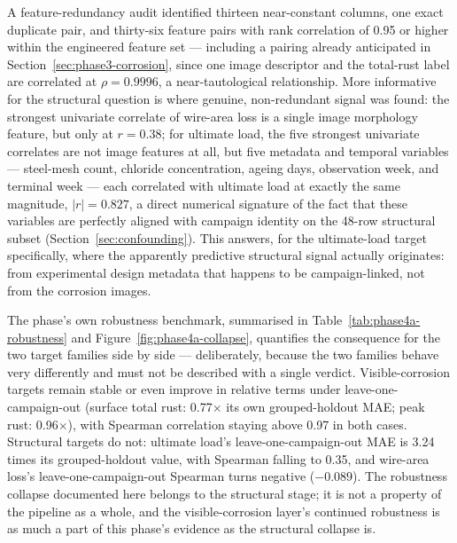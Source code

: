 A feature-redundancy audit identified thirteen near-constant columns, one
exact duplicate pair, and thirty-six feature pairs with rank correlation of
0.95 or higher within the engineered feature set — including a pairing
already anticipated in Section~\ref{sec:phase3-corrosion}, since one image
descriptor and the total-rust label are correlated at $\rho=0.9996$, a
near-tautological relationship. More informative for the structural
question is where genuine, non-redundant signal was found: the strongest
univariate correlate of wire-area loss is a single image morphology
feature, but only at $r=0.38$; for ultimate load, the five strongest
univariate correlates are not image features at all, but five metadata and
temporal variables — steel-mesh count, chloride concentration, ageing days,
observation week, and terminal week — each correlated with ultimate load at
exactly the same magnitude, $|r|=0.827$, a direct numerical signature of
the fact that these variables are perfectly aligned with campaign identity
on the 48-row structural subset (Section~\ref{sec:confounding}). This
answers, for the ultimate-load target specifically, where the apparently
predictive structural signal actually originates: from experimental design
metadata that happens to be campaign-linked, not from the corrosion images.

The phase's own robustness benchmark, summarised in
Table~\ref{tab:phase4a-robustness} and Figure~\ref{fig:phase4a-collapse},
quantifies the consequence for the two target families side by side —
deliberately, because the two families behave very differently and must
not be described with a single verdict. Visible-corrosion targets remain
stable or even improve in relative terms under leave-one-campaign-out
(surface total rust: 0.77$\times$ its own grouped-holdout MAE; peak rust:
0.96$\times$), with Spearman correlation staying above 0.97 in both cases.
Structural targets do not: ultimate load's leave-one-campaign-out MAE is
3.24 times its grouped-holdout value, with Spearman falling to 0.35, and
wire-area loss's leave-one-campaign-out Spearman turns negative
($-0.089$). The robustness collapse documented here belongs to the
structural stage; it is not a property of the pipeline as a whole, and the
visible-corrosion layer's continued robustness is as much a part of this
phase's evidence as the structural collapse is.

